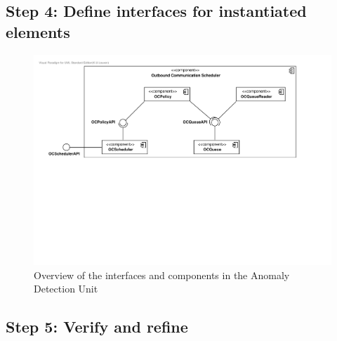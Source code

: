 \subsection{Step 4: Define interfaces for instantiated elements}
\label{add:it6/interfaces}


\begin{figure}[H]
	\begin{centering}
		\includegraphics[width=\textwidth]{figs/add-it6-interfaces.pdf}
		\caption{Overview of the interfaces and components in the Anomaly Detection
		Unit}
		\label{fig:it6/interfaces}
	\end{centering}
\end{figure}

\subsection{Step 5: Verify and refine}
\label{add:it6/verification}


